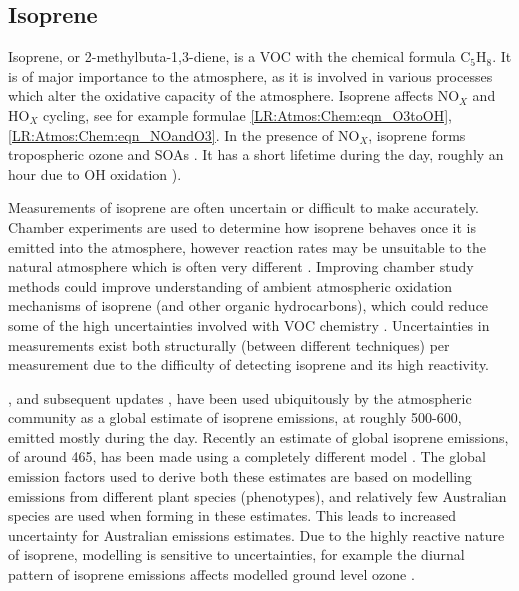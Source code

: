     
    
    
    
  \subsection{Isoprene}
  \label{LR:VOCs:Isop}
    Isoprene, or 2-methylbuta-1,3-diene, is a VOC with the chemical formula C$_5$H$_8$. 
    It is of major importance to the atmosphere, as it is involved in various processes which alter the oxidative capacity of the atmosphere.
    Isoprene affects NO$_X$ and HO$_X$ cycling, see for example formulae \ref{LR:Atmos:Chem:eqn_O3toOH}, \ref{LR:Atmos:Chem:eqn_NOandO3}.
    In the presence of NO$_X$, isoprene forms tropospheric ozone and SOAs \parencite{Wagner2002, Millet2006}.
    It has a short lifetime during the day, roughly an hour due to OH oxidation \parencite{AtkinsonArey2003}).
    
    Measurements of isoprene are often uncertain or difficult to make accurately.
    Chamber experiments are used to determine how isoprene behaves once it is emitted into the atmosphere, however reaction rates may be unsuitable to the natural atmosphere which is often very different \parencite{Kanakidou2005,Nguyen2014}.
    Improving chamber study methods could improve understanding of ambient atmospheric oxidation mechanisms of isoprene (and other organic hydrocarbons), which could reduce some of the high uncertainties involved with VOC chemistry \parencite{Nguyen2014}.
    Uncertainties in measurements exist both structurally (between different techniques) per measurement due to the difficulty of detecting isoprene and its high reactivity.
    
    \textcite{Guenther1995}, and subsequent updates \parencite{Guenther2000,Guenther2006,Guenther2012}, have been used ubiquitously by the atmospheric community as a global estimate of isoprene emissions, at roughly 500-600\tgpyr, emitted mostly during the day.
    Recently an estimate of global isoprene emissions, of around 465\tgcpyr, has been made using a completely different model \parencite{Messina2016}.
    The global emission factors used to derive both these estimates are based on modelling emissions from different plant species (phenotypes), and relatively few Australian species are used when forming in these estimates.
    This leads to increased uncertainty for Australian emissions estimates.
    Due to the highly reactive nature of isoprene, modelling is sensitive to uncertainties, for example the diurnal pattern of isoprene emissions affects modelled ground level ozone \parencite{Hewitt2011, Fan2004}.
    
